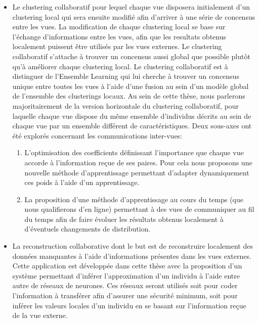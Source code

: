 \begin{itemize}
    \item Le clustering collaboratif pour lequel chaque vue disposera initialement d'un clustering local qui sera ensuite modifié afin d'arriver à une série de concensus entre les vues. La modification de chaque clustering local se base sur l'échange d'informations entre les vues, afin que les resultats obtenus localement puissent être utilisés par les vues externes. Le clustering collaboratif s'attache à trouver un concensus aussi global que possible plutôt qu'à améliorer chaque clustering local. Le clustering collaboratif est à distinguer de l'Ensemble Learning qui lui cherche à trouver un concensus unique entre toutes les vues à l'aide d'une fusion au sein d'un modèle global de l'ensemble des clusterings locaux. Au sein de cette thèse, nous parlerons majoritairement de la version horizontale du clustering collaboratif, pour laquelle chaque vue dispose du même ensemble d'individus décrits au sein de chaque vue par un ensemble différent de caractéristiques. Deux sous-axes ont été explorés concernant les communications inter-vues:
        \begin{enumerate}
            \item L'optimisation des coefficients définissant l'importance que chaque vue accorde à l'information reçue de ses paires. Pour cela nous proposons une nouvelle méthode d'apprentissage permettant d'adapter dynamiquement ces poids à l'aide d'un apprentissage.
            \item La proposition d'une méthode d'apprentissage au cours du temps (que nous qualifierons d'en ligne) permettant à des vues de communiquer au fil du temps afin de faire évoluer les résultats obtenus localement à d'éventuels changements de distribution.
        \end{enumerate}

    \item La reconstruction collaborative dont le but est de reconstruire localement des données manquantes à l'aide d'informations présentes dans les vues externes. Cette application est développée dans cette thèse avec la proposition d'un système permettant d'inférer l'approximation d'un individu à l'aide entre autre de réseaux de neurones. Ces réseaux seront utilisés soit pour coder l'information à transférer afin d'assurer une sécurité minimum, soit pour inférer les valeurs locales d'un individu en se basant sur l'information reçue de la vue externe.
\end{itemize}


